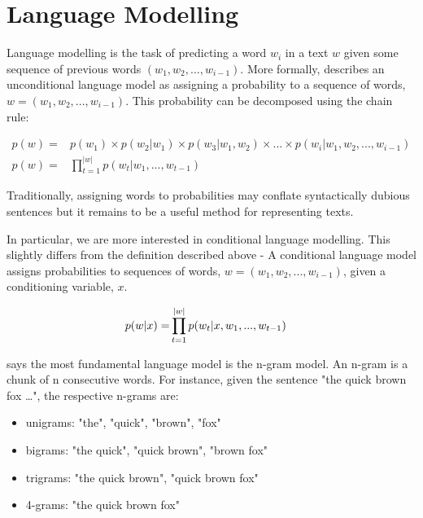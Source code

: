 \documentclass[12pt,twoside]{report}
\begin{document}
\section{Language Modelling}

Language modelling is the task of predicting a word $w_i$ in a text $w$ given some sequence of previous words $(w_1, w_2, ..., w_{i-1})$. More formally, \cite{dyer_conditional_2017} describes an unconditional language model as assigning a probability to a sequence of words,  $w = (w_1, w_2, ..., w_{i-1})$. This probability can be decomposed using the chain rule:

\begin{align}
p(w) = &{} p(w_1) \times p(w_2|w_1) \times p(w_3|w_1, w_2) \times ... \times p(w_i|w_1, w_2, ..., w_{i-1}) \\
p(w) = &{} \prod^{|w|}_{t=1}p(w_t|w_1, ..., w_{t-1})
\end{align}

Traditionally, assigning words to probabilities may conflate syntactically dubious sentences but it remains to be a useful method for representing texts.  

In particular, we are more interested in conditional language modelling. This slightly differs from the definition described above - A conditional language model assigns probabilities to sequences of words, $w = (w_1, w_2, ..., w_{i-1})$, given a conditioning variable, $x$. 

\begin{align}
	p(\boldmath{w}|x) = &{} \prod^{|w|}_{t=1}p(w_t|x,w_1, ..., w_{t-1})
\end{align}

\cite{le_recurrent_2018} says the most fundamental language model is the n-gram model. An n-gram is a chunk of n consecutive words. For instance, given the sentence "the quick brown fox \ldots", the respective n-grams are: 

\begin{itemize}  
	\item unigrams: "the", "quick", "brown", "fox"
	\item bigrams: "the quick", "quick brown", "brown fox"
	\item trigrams: "the quick brown", "quick brown fox"
	\item 4-grams: "the quick brown fox"
\end{itemize}
\end{document}
